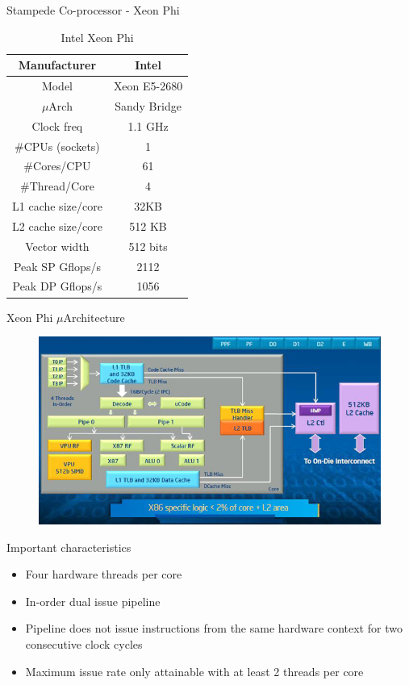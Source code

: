\documentclass{beamer}
\begin{document}
\begin{frame}{Stampede Co-processor - Xeon Phi}
\begin{table}[H]
\centering
\footnotesize
\begin{tabular}{| c | c |}\hline
Manufacturer & Intel\\ \hline
Model & Xeon E5-2680\\ \hline
$\mu$Arch & Sandy Bridge\\ \hline
Clock freq & 1.1 GHz\\ \hline
\#CPUs (sockets) & 1 \\ \hline
\#Cores/CPU & 61\\ \hline
\#Thread/Core & 4\\ \hline
L1 cache size/core & 32KB\\ \hline
L2 cache size/core & 512 KB\\ \hline
Vector width & 512 bits\\ \hline
Peak SP Gflops/s & 2112\\ \hline
Peak DP Gflops/s & 1056\\ \hline
\end{tabular}
\caption{Intel Xeon Phi}
\end{table}
\end{frame}

\begin{frame}{Xeon Phi $\mu$Architecture}
  \begin{center}
  \begin{figure}[htbp]
      \includegraphics[scale=.45]{img/phi_arch.jpg}
  \end{figure}
  \end{center}
\end{frame}

\begin{frame}{Important characteristics}
  \begin{itemize}
    \item Four hardware threads per core
    \item In-order dual issue pipeline
    \item Pipeline does not issue instructions from the same hardware
      context for two consecutive clock cycles
    \item Maximum issue rate only attainable with at least 2 threads per
      core
  \end{itemize}
\end{frame}
\end{document}
